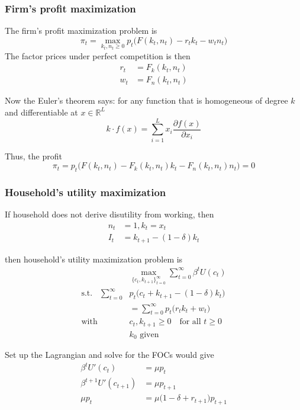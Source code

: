 \documentclass[twocolumn, fleqn]{article}
\begin{document}
	\subsubsection{Firm's profit maximization}
	The firm's profit maximization problem is 
	\[
	\pi_t = \max_{k_t, n_t \geq 0} p_t \big(F(k_t, n_t) - r_t k_t - w_t n_t\big)
	\]
	The factor prices under perfect competition is then 
	\begin{align*}
		r_t &= F_k(k_t, n_t)\\
		w_t &= F_n(k_t, n_t)
	\end{align*}
	
	Now the Euler's theorem says: for any function that is homogeneous of degree $k$ and differentiable at $x\in \mathbb{R}^L$
	\[k \cdot f(x) = \sum_{i=1}^{L} x_i \frac{\partial f(x)}{\partial x_i}\]
	
	Thus, the profit 
	\[
	\pi_t = p_t \big(F(k_t, n_t) - F_k(k_t, n_t) k_t - F_n(k_t, n_t) n_t\big) = 0
	\]
	
	\subsubsection{Household's utility maximization}
	
	If household does not derive disutility from working, then 
	\begin{align*}
		n_t &=1, k_t = x_t \\
		I_t &= k_{t+1} - (1-\delta)k_t
	\end{align*}
	
	then household's utility maximization problem is
	\begin{align*}
	&\max_{\{c_t, k_{t+1}\}_{t=0}^\infty} \sum_{t=0}^\infty \beta^t U(c_t) \\
	\text{s.t.} \quad \sum_{t=0}^\infty &p_t \big(c_t + k_{t+1} - (1 - \delta)k_t\big)\\
	&= \sum_{t=0}^\infty p_t \big(r_t k_t + w_t\big) \\
	\text{with }& c_t, k_{t+1} \geq 0 \quad \text{for all } t \geq 0 \\
	&k_0 \text{ given}
	\end{align*}
	
	Set up the Lagrangian and solve for the FOCs would give 
	\begin{align*}
	\beta^t U'(c_t) &= \mu p_t \\
	\beta^{t+1} U'(c_{t+1}) &= \mu p_{t+1} \\
	\mu p_t &= \mu \big(1 - \delta + r_{t+1}\big) p_{t+1}
	\end{align*}
	
\end{document}
